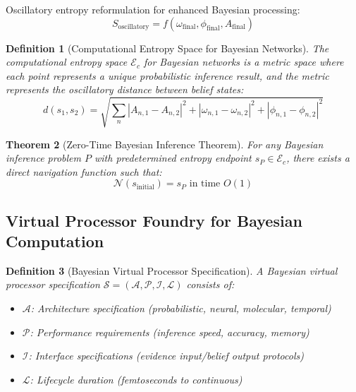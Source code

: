 \documentclass[12pt,a4paper]{article}
\newtheorem{theorem}{Theorem}[section]
\newtheorem{definition}[theorem]{Definition}
\begin{document}
Oscillatory entropy reformulation for enhanced Bayesian processing:
\begin{equation}
S_{\text{oscillatory}} = f(\omega_{\text{final}}, \phi_{\text{final}}, A_{\text{final}})
\end{equation}

\begin{definition}[Computational Entropy Space for Bayesian Networks]
The computational entropy space $\mathcal{E}_c$ for Bayesian networks is a metric space where each point represents a unique probabilistic inference result, and the metric represents the oscillatory distance between belief states:
\begin{equation}
d(s_1, s_2) = \sqrt{\sum_{n} |A_{n,1} - A_{n,2}|^2 + |\omega_{n,1} - \omega_{n,2}|^2 + |\phi_{n,1} - \phi_{n,2}|^2}
\end{equation}
\end{definition}

\begin{theorem}[Zero-Time Bayesian Inference Theorem]
For any Bayesian inference problem $P$ with predetermined entropy endpoint $s_P \in \mathcal{E}_c$, there exists a direct navigation function such that:
\begin{equation}
\mathcal{N}(s_{\text{initial}}) = s_P \text{ in time } O(1)
\end{equation}
\end{theorem}

\subsection{Virtual Processor Foundry for Bayesian Computation}

\begin{definition}[Bayesian Virtual Processor Specification]
A Bayesian virtual processor specification $\mathcal{S} = (\mathcal{A}, \mathcal{P}, \mathcal{I}, \mathcal{L})$ consists of:
\begin{itemize}
\item $\mathcal{A}$: Architecture specification (probabilistic, neural, molecular, temporal)
\item $\mathcal{P}$: Performance requirements (inference speed, accuracy, memory)
\item $\mathcal{I}$: Interface specifications (evidence input/belief output protocols)
\item $\mathcal{L}$: Lifecycle duration (femtoseconds to continuous)
\end{itemize}
\end{definition}
\end{document}
